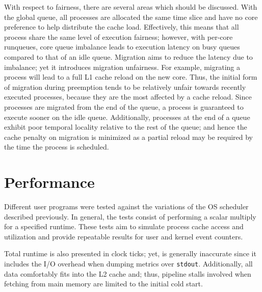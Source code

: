 \documentclass[11pt]{article}
\begin{document}
With respect to fairness, there are several areas which should be discussed.  With the global queue, all processes are allocated the same time slice and have no core preference to help distribute the cache load.  Effectively, this means that all process share the same level of execution fairness; however, with per-core runqueues, core queue imbalance leads to execution latency on busy queues compared to that of an idle queue.  Migration aims to reduce the latency due to imbalance; yet it introduces migration unfairness.  For example, migrating a process will lead to a full L1 cache reload on the new core.  Thus, the initial form of migration during preemption tends to be relatively unfair towards recently executed processes, because they are the most affected by a cache reload.  Since processes are migrated from the end of the queue, a process is guaranteed to execute sooner on the idle queue.  Additionally, processes at the end of a queue exhibit poor temporal locality relative to the rest of the queue; and hence the cache penalty on migration is minimized as a partial reload may be required by the time the process is scheduled.

\section{Performance}
\label{sec:performance}
Different user programs were tested against the variations of the OS scheduler described previously.  In general, the tests consist of performing a scalar multiply for a specified runtime.  These tests aim to simulate process cache access and utilization and provide repeatable results for user and kernel event counters.

Total runtime is also presented in clock ticks; yet, is generally inaccurate since it includes the I/O overhead when dumping metrics over \texttt{stdout}.  Additionally, all data comfortably fits into the L2 cache and; thus, pipeline stalls involved when fetching from main memory are limited to the initial cold start.
\end{document}
